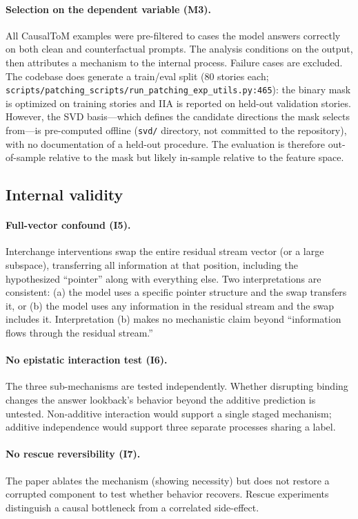 \documentclass[11pt]{article}
\begin{document}
\paragraph{Selection on the dependent variable (M3).}
All CausalToM examples were pre-filtered to cases the model answers correctly on both clean and counterfactual prompts. The analysis conditions on the output, then attributes a mechanism to the internal process. Failure cases are excluded. The codebase does generate a train/eval split (80 stories each; \texttt{scripts/patching\_scripts/run\_patching\_exp\_utils.py:465}): the binary mask is optimized on training stories and IIA is reported on held-out validation stories. However, the SVD basis---which defines the candidate directions the mask selects from---is pre-computed offline (\texttt{svd/} directory, not committed to the repository), with no documentation of a held-out procedure. The evaluation is therefore out-of-sample relative to the mask but likely in-sample relative to the feature space.

\subsection{Internal validity}

\paragraph{Full-vector confound (I5).}
Interchange interventions swap the entire residual stream vector (or a large subspace), transferring all information at that position, including the hypothesized ``pointer'' along with everything else. Two interpretations are consistent: (a) the model uses a specific pointer structure and the swap transfers it, or (b) the model uses any information in the residual stream and the swap includes it. Interpretation (b) makes no mechanistic claim beyond ``information flows through the residual stream.''

\paragraph{No epistatic interaction test (I6).}
The three sub-mechanisms are tested independently. Whether disrupting binding changes the answer lookback's behavior beyond the additive prediction is untested. Non-additive interaction would support a single staged mechanism; additive independence would support three separate processes sharing a label.

\paragraph{No rescue reversibility (I7).}
The paper ablates the mechanism (showing necessity) but does not restore a corrupted component to test whether behavior recovers. Rescue experiments distinguish a causal bottleneck from a correlated side-effect.
\end{document}
